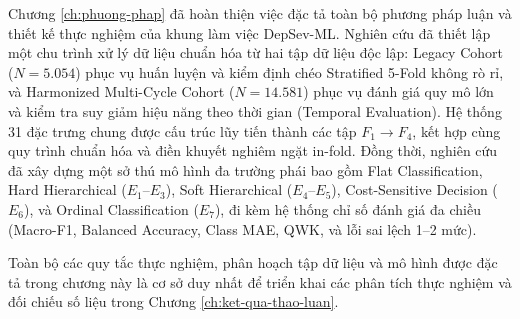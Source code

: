 Chương \ref{ch:phuong-phap} đã hoàn thiện việc đặc tả toàn bộ phương pháp luận và thiết kế thực nghiệm của khung làm việc DepSev-ML. Nghiên cứu đã thiết lập một chu trình xử lý dữ liệu chuẩn hóa từ hai tập dữ liệu độc lập: Legacy Cohort ($N=5.054$) phục vụ huấn luyện và kiểm định chéo Stratified 5-Fold không rò rỉ, và Harmonized Multi-Cycle Cohort ($N=14.581$) phục vụ đánh giá quy mô lớn và kiểm tra suy giảm hiệu năng theo thời gian (Temporal Evaluation). Hệ thống 31 đặc trưng chung được cấu trúc lũy tiến thành các tập $F_1 \to F_4$, kết hợp cùng quy trình chuẩn hóa và điền khuyết nghiêm ngặt in-fold. Đồng thời, nghiên cứu đã xây dựng một sở thú mô hình đa trường phái bao gồm Flat Classification, Hard Hierarchical ($E_1$--$E_3$), Soft Hierarchical ($E_4$--$E_5$), Cost-Sensitive Decision ($E_6$), và Ordinal Classification ($E_7$), đi kèm hệ thống chỉ số đánh giá đa chiều (Macro-F1, Balanced Accuracy, Class MAE, QWK, và lỗi sai lệch 1--2 mức).

Toàn bộ các quy tắc thực nghiệm, phân hoạch tập dữ liệu và mô hình được đặc tả trong chương này là cơ sở duy nhất để triển khai các phân tích thực nghiệm và đối chiếu số liệu trong Chương \ref{ch:ket-qua-thao-luan}.
\cleardoublepage
